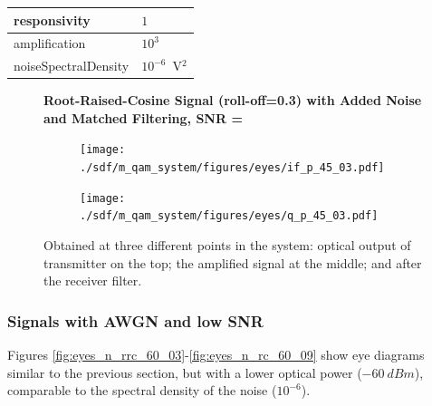 \begin{refsection}
\begin{table}[H]
\begin{tabular}{|l|l|}
		responsivity           & $1$                                                        \\ \hline
		amplification          & $10^3$                                                     \\ \hline
		noiseSpectralDensity   & $10^{-6}$~V$^2$                             					\\ \hline
	\end{tabular}
\end{table}
\begin{figure}[H]
		\centering
	\textbf{Root-Raised-Cosine Signal (roll-off=0.3) with Added Noise and Matched Filtering, SNR = }
	\begin{minipage}{\linewidth}
		\centering
	\begin{subfigure}{.45\textwidth}
		\centering
		\texttt{[image: ./sdf/m\_qam\_system/figures/eyes/if\_p\_45\_03.pdf]}
	\end{subfigure}
	\begin{subfigure}{.45\textwidth}
		\centering
		\texttt{[image: ./sdf/m\_qam\_system/figures/eyes/q\_p\_45\_03.pdf]}
	\end{subfigure}
	
	\caption{
		Obtained at three different points in the system: optical output of transmitter on the top;
		the amplified signal at the middle; and
		after the receiver filter.
		\label{fig:eyes_n_rrc_45_03}}
	\end{minipage}
\end{figure}



\subsubsection*{Signals with AWGN and low SNR}
Figures \ref{fig:eyes_n_rrc_60_03}-\ref{fig:eyes_n_rc_60_09} show eye
diagrams similar to the previous section, but with a lower optical power ($-60~dBm$),
comparable to the spectral density of the noise ($10^{-6}$).




\end{refsection}
